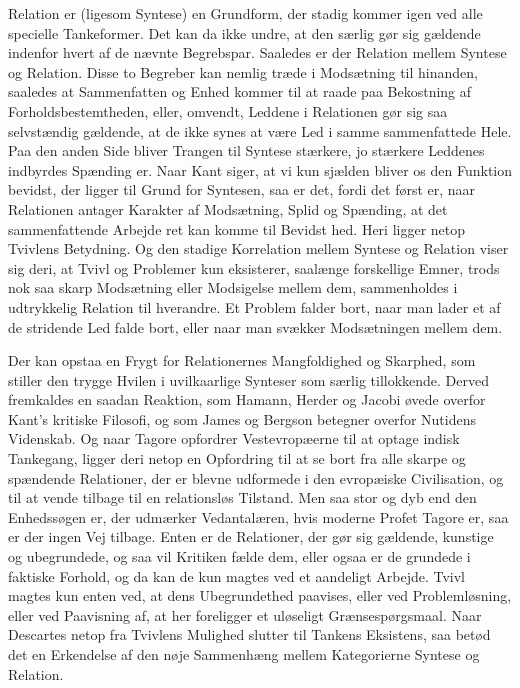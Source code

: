 \documentclass[12pt]{article}
\newcommand{\opage}[1]{\marginnote{\footnotesize\textit{[#1]}}}
\begin{document}
Relation er (ligesom Syntese) en Grundform, der stadig
kommer igen ved alle specielle Tankeformer. Det kan da
ikke undre, at den særlig gør sig gældende indenfor hvert
af de nævnte Begrebspar. Saaledes er der Relation mellem
Syntese og Relation. Disse to Begreber kan nemlig træde
i Modsætning til hinanden, saaledes at Sammenfatten og
Enhed kommer til at raade paa Bekostning af Forholdsbestemtheden,
eller, omvendt, Leddene i Relationen gør sig
saa selvstændig gældende, at de ikke synes at være Led i
samme sammenfattede Hele. Paa den anden Side bliver
Trangen til Syntese stærkere, jo stærkere Leddenes indbyrdes
Spænding er. Naar Kant siger, at vi kun sjælden
bliver os den Funktion bevidst, der ligger til Grund for
Syntesen, saa er det, fordi det først er, naar Relationen
antager Karakter af Modsætning, Splid og Spænding, at
det sammenfattende Arbejde ret kan komme til Bevidst%
\opage{28}hed. Heri ligger netop Tvivlens Betydning. Og den stadige
Korrelation mellem Syntese og Relation viser sig deri, at
Tvivl og Problemer kun eksisterer, saalænge forskellige
Emner, trods nok saa skarp Modsætning eller Modsigelse
mellem dem, sammenholdes i udtrykkelig Relation til hverandre.
Et Problem falder bort, naar man lader et af de
stridende Led falde bort, eller naar man svækker Modsætningen
mellem dem.

Der kan opstaa en Frygt for Relationernes Mangfoldighed
og Skarphed, som stiller den trygge Hvilen i uvilkaarlige
Synteser som særlig tillokkende. Derved fremkaldes
en saadan Reaktion, som Hamann, Herder og Jacobi øvede
overfor Kant's kritiske Filosofi, og som James og Bergson
betegner overfor Nutidens Videnskab. Og naar Tagore opfordrer
Vestevropæerne til at optage indisk Tankegang,
ligger deri netop en Opfordring til at se bort fra alle skarpe
og spændende Relationer, der er blevne udformede i den
evropæiske Civilisation, og til at vende tilbage til en relationsløs
Tilstand. Men saa stor og dyb end den Enhedssøgen
er, der udmærker Vedantalæren, hvis moderne Profet
Tagore er, saa er der ingen Vej tilbage. Enten er de
Relationer, der gør sig gældende, kunstige og ubegrundede,
og saa vil Kritiken fælde dem, eller ogsaa er de grundede
i faktiske Forhold, og da kan de kun magtes ved et aandeligt
Arbejde. Tvivl magtes kun enten ved, at dens Ubegrundethed
paavises, eller ved Problemløsning, eller ved
Paavisning af, at her foreligger et uløseligt Grænsespørgsmaal.
Naar Descartes netop fra Tvivlens Mulighed slutter
til Tankens Eksistens, saa betød det en Erkendelse af den
nøje Sammenhæng mellem Kategorierne Syntese og Relation.
\end{document}
